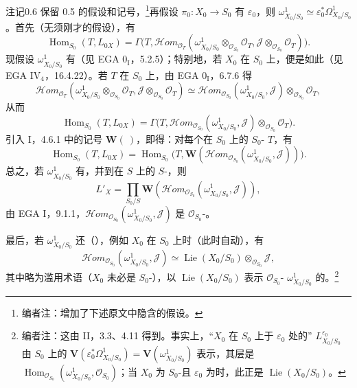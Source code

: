 \begin{SGAresult}{注记}{0.6}
保留 0.5 的假设和记号，\footnote{编者注：增加了下述原文中隐含的假设。}再假设 $\pi_0:X_0\to S_0$ 有 $\varepsilon_0$，则 $\omega^1_{X_0/S_0}\simeq\varepsilon_0^*\Omega^1_{X_0/S_0}$。首先（无须刚才的假设），有
\[\operatorname{Hom}_{S_0}(T,L_{0X})=\Gamma\bigl(T,\mathcal Hom_{\mathcal O_T}(\omega^1_{X_0/S_0}\otimes_{\mathcal O_{S_0}}\mathcal O_T,\mathcal J\otimes_{\mathcal O_{S_0}}\mathcal O_T)\bigr).\]
现假设 $\omega^1_{X_0/S_0}$ 有（见 EGA 0$_{\mathrm I}$，5.2.5）；特别地，若 $X_0$ 在 $S_0$ 上，便是如此（见 EGA IV$_4$，16.4.22）。若 $T$ 在 $S_0$ 上，由 EGA 0$_{\mathrm I}$，6.7.6 得
\[\mathcal Hom_{\mathcal O_T}(\omega^1_{X_0/S_0}\otimes_{\mathcal O_{S_0}}\mathcal O_T,\mathcal J\otimes_{\mathcal O_{S_0}}\mathcal O_T)\simeq\mathcal Hom_{\mathcal O_{S_0}}(\omega^1_{X_0/S_0},\mathcal J)\otimes_{\mathcal O_{S_0}}\mathcal O_T,\]
从而
\[\operatorname{Hom}_{S_0}(T,L_{0X})=\Gamma\bigl(T,\mathcal Hom_{\mathcal O_{S_0}}(\omega^1_{X_0/S_0},\mathcal J)\otimes_{\mathcal O_{S_0}}\mathcal O_T\bigr).\]
引入 I，4.6.1 中的记号 $\mathbf W(\ )$，即得：对每个在 $S_0$ 上的 $S_0$- $T$，有
\[\operatorname{Hom}_{S_0}(T,L_{0X})=\operatorname{Hom}_{S_0}\bigl(T,\mathbf W(\mathcal Hom_{\mathcal O_{S_0}}(\omega^1_{X_0/S_0},\mathcal J))\bigr).\]
总之，若 $\omega^1_{X_0/S_0}$ 有，并到在 $S$ 上的 $S$-，则
\[L'_X=\prod_{S_0/S}\mathbf W(\mathcal Hom_{\mathcal O_{S_0}}(\omega^1_{X_0/S_0},\mathcal J)),\tag{0.6.1}\]
由 EGA I，9.1.1，$\mathcal Hom_{\mathcal O_{S_0}}(\omega^1_{X_0/S_0},\mathcal J)$ 是 $\mathcal O_{S_0}$-。

最后，若 $\omega^1_{X_0/S_0}$ 还（），例如 $X_0$ 在 $S_0$ 上时（此时自动），有
\[\mathcal Hom_{\mathcal O_{S_0}}(\omega^1_{X_0/S_0},\mathcal J)\simeq\operatorname{Lie}(X_0/S_0)\otimes_{\mathcal O_{S_0}}\mathcal J,\tag{0.6.2}\]
其中略为滥用术语（$X_0$ 未必是 $S_0$-），以 $\operatorname{Lie}(X_0/S_0)$ 表示 $\mathcal O_{S_0}$- $\omega^1_{X_0/S_0}$ 的。\footnote{编者注：这由 II，3.3、4.11 得到。事实上，“$X_0$ 在 $S_0$ 上于 $\varepsilon_0$ 处的” $L^{\varepsilon_0}_{X_0/S_0}$ 由 $S_0$ 上的 $\mathbf V(\varepsilon_0^*\Omega^1_{X_0/S_0})=\mathbf V(\omega^1_{X_0/S_0})$ 表示，其层是 $\operatorname{Hom}_{\mathcal O_{S_0}}(\omega^1_{X_0/S_0},\mathcal O_{S_0})$；当 $X_0$ 为 $S_0$-且 $\varepsilon_0$ 为时，此正是 $\operatorname{Lie}(X_0/S_0)$。}
\end{SGAresult}
